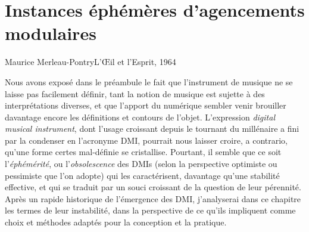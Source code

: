 %
\chapter{Instances éphémères d'agencements modulaires}
\label{ch:ephemeral}



{Maurice Merleau-Pontry}{L'Œil et l'Esprit, 1964} %


\vspace*{\fill}

\noindent Nous avons exposé dans le préambule le fait que l'instrument de musique ne se laisse pas facilement définir, tant la notion de musique est sujette à des interprétations diverses, et que l'apport du numérique sembler venir brouiller davantage encore les définitions et contours de l'objet. L'expression \textit{digital musical instrument}, dont l'usage croissant depuis le tournant du millénaire a fini par la condenser en l'acronyme \gls{DMI}, pourrait nous laisser croire, a contrario, qu'une forme certes mal-définie se cristallise. Pourtant, il semble que ce soit l'\textit{éphémérité}, ou l'\textit{obsolescence} des \glspl{DMI} (selon la perspective optimiste ou pessimiste que l'on adopte) qui les caractérisent, davantage qu'une stabilité effective, et qui se traduit par un souci croissant de la question de leur pérennité.\\
\indent Après un rapide historique de l'émergence des \gls{DMI}, j'analyserai dans ce chapitre les termes de leur instabilité, dans la perspective de ce qu'ils impliquent comme choix et méthodes adaptés pour la conception et la pratique.

